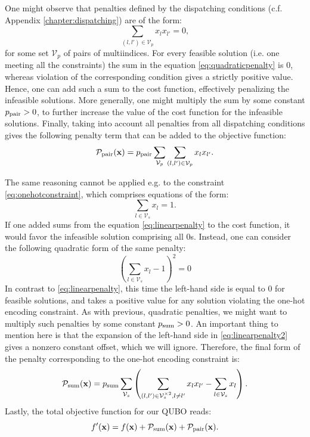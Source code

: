 One might observe that penalties defined by the dispatching conditions (c.f.
Appendix \ref{chapter:dispatching}) are of the form:
\begin{equation}
  \label{eq:quadraticpenalty}
  \sum_{(l, l') \in \mathcal{V}_{p}} x_{l}x_{l'} = 0,
\end{equation}
for some set $\mathcal{V}_{p}$ of pairs of multiindices. For every feasible
solution (i.e. one meeting all the constraints) the sum in the equation
\eqref{eq:quadraticpenalty} is 0, whereas violation of the corresponding
condition gives a strictly positive value. Hence, one can add such a sum to the
cost function, effectively penalizing the infeasible solutions. More generally,
one might multiply the sum by some constant $p_{\text{pair}} > 0$, to further increase
the value of the cost function for the infeasible solutions. Finally, taking
into account all penalties from all dispatching conditions gives the following
penalty term that can be added to the objective function:
\begin{equation}
  \mathcal{P}_{\text{pair}}(\mathbf{x}) = p_{\text{pair}} \sum_{\mathcal{V}_{p}}\sum_{(l, l') \in \mathcal{V}_{p}} x_{l}x_{l'}.
\end{equation}

The same reasoning cannot be applied e.g. to the constraint
\eqref{eq:onehotconstraint}, which comprises equations of the form:
\begin{equation}
  \label{eq:linearpenalty}
  \sum_{l \in \mathcal{V}_{s}}x_{l} = 1.
\end{equation}
If one added sums from the equation \eqref{eq:linearpenalty} to the cost
function, it would favor the infeasible solution comprising all 0s. Instead,
one can consider the following quadratic form of the same penalty:
\begin{equation}
  \label{eq:linearpenalty2}
  \left(\sum_{l \in \mathcal{V}_{s}}x_{l} -1 \right)^{2} = 0
\end{equation}
In contrast to \eqref{eq:linearpenalty}, this time the left-hand side is equal
to 0 for feasible solutions, and takes a positive value for any solution
violating the one-hot encoding constraint. As with previous, quadratic
penalties, we might want to multiply such penalties by some constant $p_{\text{sum}} >
  0$. An important thing to mention here is that the expansion of the left-hand
side in \eqref{eq:linearpenalty2} gives a nonzero constant offset, which we
will ignore. Therefore, the final form of the penalty corresponding to the
one-hot encoding constraint is:
\begin{equation}
  \mathcal{P}_{\text{sum}}(\mathbf{x}) = p_{\text{sum}} \sum_{\mathcal{V}_{s}}\left(\sum_{(l,l') \in \mathcal{V}_{s}^{\times 2}, l\ne l'} x_{l}x_{l'}  - \sum_{l \in \mathcal{V}_{s}}x_{l}\right).
\end{equation}
Lastly, the total objective function for our QUBO reads:
\begin{equation}
  f'(\mathbf{x}) = f(\mathbf{x}) + \mathcal{P}_{\text{sum}}(\mathbf{x}) + \mathcal{P}_{\text{pair}}(\mathbf{x}).
\end{equation}

